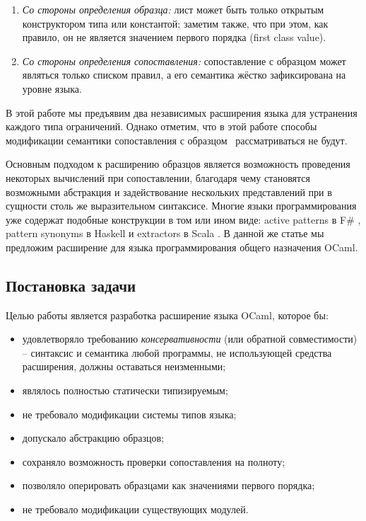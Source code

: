 \begin{enumerate}
	\item \textit{Со стороны определения образца:} лист может быть только открытым конструктором типа или константой; заметим также, что при этом, как правило, он не является значением первого порядка (first class value).
	\item \textit{Со стороны определения сопоставления:} сопоставление с образцом может являться только списком правил, а его семантика жёстко зафиксирована на уровне языка.
\end{enumerate}

В этой работе мы предъявим два независимых расширения языка для устранения каждого типа ограничений. Однако отметим, что в этой работе способы модификации семантики сопоставления с образцом~\cite{syme2007extensible, tullsen2000firstclass} рассматриваться не будут.

Основным подходом к расширению образцов является возможность проведения некоторых вычислений при сопоставлении, благодаря чему становятся возможными абстракция и задействование нескольких представлений при в сущности столь же выразительном синтаксисе. Многие языки программирования уже содержат подобные конструкции в том или ином виде: active patterns в F\# \cite{syme2007extensible}, pattern synonyms в Haskell \cite{pickering2016pattern} и extractors в Scala \cite{emir2007objects}. В данной же статье мы предложим расширение для языка программирования общего назначения OCaml.

\subsection*{Постановка задачи}
\noindent Целью работы является разработка расширение языка OCaml, которое бы:

\begin{itemize}
  \item удовлетворяло требованию \textit{консервативности} (или обратной совместимости) -- синтаксис и семантика любой программы, не использующей средства расширения, должны оставаться неизменными;
  \item являлось полностью статически типизируемым;
  \item не требовало модификации системы типов языка; 
	\item допускало абстракцию образцов;
	\item сохраняло возможность проверки сопоставления на полноту;
	\item позволяло оперировать образцами как значениями первого \mbox{порядка};
  \item не требовало модификации существующих модулей.
\end{itemize}

